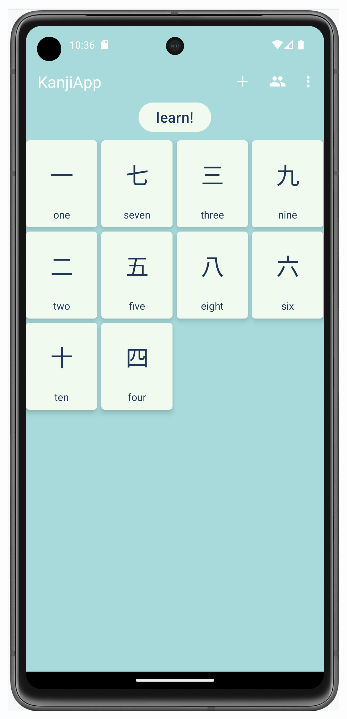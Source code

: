 \documentclass[a4paper,twoside,12pt]{book}
\begin{document}

\begin{figure}
\centering
\begin{subfigure}{0.3\textwidth}
    \includegraphics[width=\textwidth]{learn/list}

\end{subfigure}
\end{figure}
\end{document}

